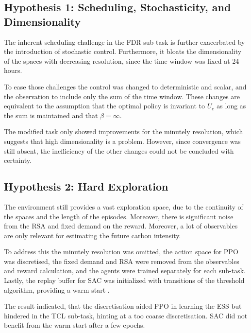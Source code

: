 \subsection{Hypothesis 1: Scheduling, Stochasticity, and Dimensionality}
The inherent scheduling challenge in the FDR sub-task is further exacerbated by the introduction of stochastic control. Furthermore, it bloats the dimensionality of the spaces with decreasing resolution, since the time window was fixed at 24 hours.
\par
To ease those challenges the control was changed to deterministic and scalar, and the observation to include only the sum of the time window. These changes are equivalent to the assumption that the optimal policy is invariant to $U_e$ as long as the sum is maintained and that $\beta = \infty$.
\par
The modified task only showed improvements for the minutely resolution, which suggests that high dimensionality is a problem. However, since convergence was still absent, the inefficiency of the other changes could not be concluded with certainty.


\subsection{Hypothesis 2: Hard Exploration}
The environment still provides a vast exploration space, due to the continuity of the spaces and the length of the episodes. Moreover, there is significant noise from the RSA and fixed demand on the reward. Moreover, a lot of observables are only relevant for estimating the future carbon intensity. 
\par
To address this the minutely resolution was omitted, the action space for PPO was discretised, the fixed demand and RSA were removed from the observables and reward calculation, and the agents were trained separately for each sub-task. Lastly, the replay buffer for SAC was initialized with transitions of the threshold algorithm, providing a warm start \cite{Wang.20.06.2023}.
\par
The result indicated, that the discretisation aided PPO in learning the ESS but hindered in the TCL sub-task, hinting at a too coarse discretisation. SAC did not benefit from the warm start after a few epochs. 


